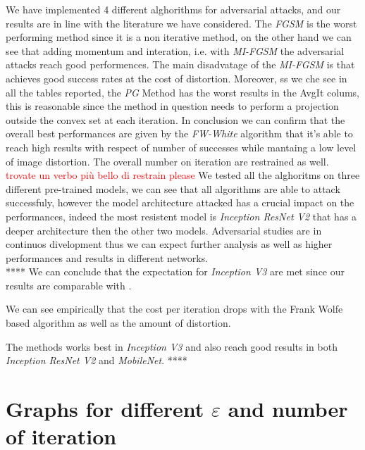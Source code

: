 \documentclass[10pt,twocolumn,letterpaper, english]{article}
\theoremstyle{definition}
\theoremstyle{plain}
\theoremstyle{plain}
\theoremstyle{plain}
\theoremstyle{plain}
\theoremstyle{remark}
\theoremstyle{remark}
\theoremstyle{definition}
\theoremstyle{definition}
\theoremstyle{definition}
\theoremstyle{definition}
\renewcommand{\epsilon}{\varepsilon}
\begin{document}
We have implemented 4 different alghorithms for adversarial attacks, and our results are in line with the literature we have considered. The \textit{FGSM} is the worst performing method since it is a non iterative method, on the other hand we can see that adding momentum and interation, i.e. with \textit{MI-FGSM} the adversarial attacks reach good performences. The main disadvatage of the \textit{MI-FGSM} is that achieves good success rates at the cost of distortion. Moreover, ss we che see in all the tables reported, the \textit{PG} Method has the worst results in the AvgIt colums, this is reasonable since the method in question needs to perform a projection outside the convex set at each iteration. In conclusion we can confirm that the overall best performances are given by the \textit{FW-White} algorithm that it's able to reach high results with respect of number of successes while mantaing a low level of image distortion. The overall number on iteration are restrained as well. \textcolor{red}{trovate un verbo più bello di restrain please}
We tested all the alghoritms on three different pre-trained models, we can see that all algorithms are able to attack successfuly, however the model architecture attacked has a crucial impact on the performances, indeed the most resistent model is \textit{Inception ResNet V2} that has a deeper architecture then the other two models.
Adversarial studies are in continuos divelopment thus we can expect further analysis as well as higher performances and results in different networks.\\

****
We can conclude that the expectation for \textit{Inception V3} are met since our results are comparable with \cite{frank}.

We can see empirically that the cost per iteration drops with the Frank Wolfe based algorithm as well as the amount of distortion.

The methods works best in \textit{Inception V3} and also reach good results in both \textit{Inception ResNet V2} and \textit{MobileNet}.
****


{\small


}


\newpage 
\onecolumn 


\appendix
\section{Graphs for different $\epsilon$ and number of iteration} \label{appendix-fig}
\end{document}
